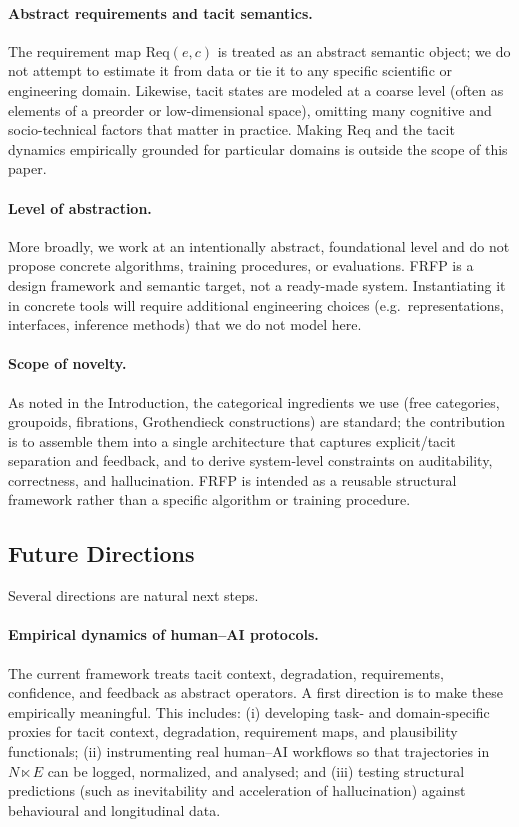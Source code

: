 \documentclass[11pt]{article}
\theoremstyle{definition}
\begin{document}
\paragraph{Abstract requirements and tacit semantics.}
The requirement map $\mathrm{Req}(e,c)$ is treated as an abstract semantic object; we do not attempt to estimate it from data or tie it to any specific scientific or engineering domain. Likewise, tacit states are modeled at a coarse level (often as elements of a preorder or low-dimensional space), omitting many cognitive and socio-technical factors that matter in practice. Making $\mathrm{Req}$ and the tacit dynamics empirically grounded for particular domains is outside the scope of this paper.

\paragraph{Level of abstraction.}
More broadly, we work at an intentionally abstract, foundational level and do not propose concrete algorithms, training procedures, or evaluations. FRFP is a design framework and semantic target, not a ready-made system. Instantiating it in concrete tools will require additional engineering choices (e.g.\ representations, interfaces, inference methods) that we do not model here.

\paragraph{Scope of novelty.}
As noted in the Introduction, the categorical ingredients we use (free categories, groupoids, fibrations, Grothendieck constructions) are standard; the contribution is to assemble them into a single architecture that captures explicit/tacit separation and feedback, and to derive system-level constraints on auditability, correctness, and hallucination. FRFP is intended as a reusable structural framework rather than a specific algorithm or training procedure.


\subsection{Future Directions}

Several directions are natural next steps.

\paragraph{Empirical dynamics of human--AI protocols.}
The current framework treats tacit context, degradation, requirements, confidence, and feedback as abstract operators. A first direction is to make these empirically meaningful. This includes: (i) developing task- and domain-specific proxies for tacit context, degradation, requirement maps, and plausibility functionals; (ii) instrumenting real human--AI workflows so that trajectories in \(N \ltimes E\) can be logged, normalized, and analysed; and (iii) testing structural predictions (such as inevitability and acceleration of hallucination) against behavioural and longitudinal data.
\end{document}
